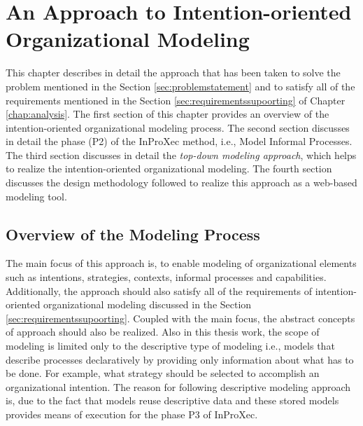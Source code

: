 \chapter{An Approach to Intention-oriented Organizational Modeling}
\label{chap:approach}
This chapter describes in detail the approach that has been taken to solve the problem mentioned in the Section \ref{sec:problemstatement}  and to satisfy all of the requirements mentioned in the Section \ref{sec:requirementssupoorting} of Chapter \ref{chap:analysis}. The first section of this chapter provides an overview of the intention-oriented organizational modeling process. The second section discusses in detail the phase (P2) of the InProXec method, i.e., Model Informal Processes. The third section discusses in detail the \textit{top-down modeling approach}, which helps to realize the intention-oriented organizational modeling. The fourth section discusses the design methodology followed to realize this approach as a web-based modeling tool. 

\section{Overview of the Modeling Process}
\label{sec:overviewmodelingprocess}
The main focus of this approach is, to enable modeling of organizational elements such as intentions, strategies, contexts, informal processes and capabilities. Additionally, the approach should also satisfy all of the requirements of intention-oriented organizational modeling discussed in the Section \ref{sec:requirementssupoorting}. Coupled with the main focus, the abstract concepts of approach should also be realized. Also in this thesis work, the scope of modeling is limited only to the descriptive type of modeling i.e., models that describe processes declaratively by providing only information about what has to be done. For example, what strategy should be selected to accomplish an organizational intention. The reason for following descriptive modeling approach is, due to the fact that models reuse descriptive data and these stored models provides means of execution for the phase P3 of InProXec. 

